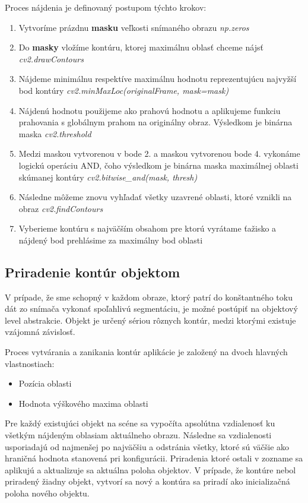 Proces nájdenia je definovaný postupom týchto krokov: 
\begin{enumerate}
  \item Vytvoríme prázdnu \textbf{masku} veľkosti snímaného obrazu \textit{np.zeros}
  \item Do \textbf{masky} vložíme kontúru, ktorej maximálnu oblasť chceme nájsť \textit{cv2.drawContours}
  \item Nájdeme minimálnu respektíve maximálnu hodnotu reprezentujúcu najvyžší bod kontúry  \textit{cv2.minMaxLoc(originalFrame, mask=mask)}
  \item Nájdenú hodnotu použijeme ako prahovú hodnotu a aplikujeme funkciu prahovania s globálnym prahom na originálny obraz. Výsledkom je binárna maska \textit{cv2.threshold}
  \item Medzi maskou vytvorenou v bode 2. a maskou vytvorenou bode 4. vykonáme logickú operáciu AND, čoho výsledkom je binárna maska maximálnej oblasti skúmanej kontúry \textit{cv2.bitwise\_and(mask, thresh)}
  \item Následne môžeme znovu vyhľadať všetky uzavrené oblasti, ktoré vznikli na obraz \textit{cv2.findContours}
  \item Vyberieme kontúru s najväčším obsahom pre ktorú vyrátame ťažisko a nájdený bod prehlásime za maximálny bod oblasti
\end{enumerate}

\subsection{Priradenie kontúr objektom}
V prípade, že sme schopný v každom obraze, ktorý patrí do konštantného toku dát zo snímača vykonať spoľahlivú segmentáciu, je možné postúpiť na objektový level abstrakcie. Objekt je určený sériou rôznych kontúr, medzi ktorými existuje vzájomná závislosť.  

Proces vytvárania a zanikania kontúr aplikácie je založený na dvoch hlavných vlastnostiach:
\begin{itemize}
\item Pozícia oblasti
\item Hodnota výškového maxima oblasti
\end{itemize}

Pre každý existujúci objekt na scéne sa vypočíta apsolútna vzdialenosť ku všetkým nájdeným oblasiam aktuálneho obrazu. Následne sa vzdialenosti usporiadajú od najmenšej po najväčšiu a odstránia všetky, ktoré sú väčšie ako hraničná hodnota stanovená pri konfigurácii. Priradenia ktoré ostali v zozname sa aplikujú a aktualizuje sa aktuálna poloha objektov. V prípade, že kontúre nebol priradený žiadny objekt, vytvorí sa nový a kontúra sa priradí ako inicializačná poloha nového objektu. 

